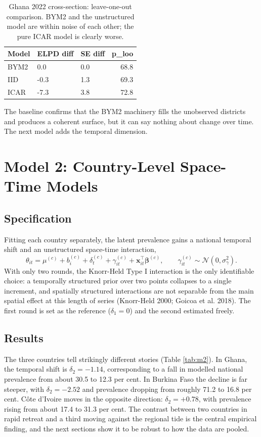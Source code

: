 \documentclass{article}
\begin{document}
\begin{longtable}[t]{lllr}
\caption{\label{tab:m1loo}\label{tab:m1loo}Ghana 2022 cross-section: leave-one-out comparison. BYM2 and the unstructured model are within noise of each other; the pure ICAR model is clearly worse.}\\
\toprule
Model & ELPD diff & SE diff & p\_loo\\
\midrule
BYM2 & 0.0 & 0.0 & 68.8\\
IID & -0.3 & 1.3 & 69.3\\
ICAR & -7.3 & 3.8 & 72.8\\
\bottomrule
\end{longtable}

The baseline confirms that the BYM2 machinery fills the unobserved
districts and produces a coherent surface, but it can say nothing about
change over time. The next model adds the temporal dimension.

\section{Model 2: Country-Level Space-Time Models}\label{sec:m2}

\subsection{Specification}\label{specification-1}

Fitting each country separately, the latent prevalence gains a national
temporal shift and an unstructured space-time interaction,
\begin{equation}
\theta_{it} = \mu^{(c)} + b_i^{(c)} + \delta_t^{(c)} + \gamma_{it}^{(c)}
              + \mathbf{x}_{it}^{\top}\bm{\beta}^{(c)},
\qquad
\gamma_{it}^{(c)} \sim \mathcal{N}(0, \sigma_\gamma^2).
\end{equation} With only two rounds, the Knorr-Held Type I interaction
is the only identifiable choice: a temporally structured prior over two
points collapses to a single increment, and spatially structured
interactions are not separable from the main spatial effect at this
length of series (Knorr-Held 2000; Goicoa et al. 2018). The first round
is set as the reference (\(\delta_1 = 0\)) and the second estimated
freely.

\subsection{Results}\label{results-1}

The three countries tell strikingly different stories (Table
\ref{tab:m2}). In Ghana, the temporal shift is \(\delta_2 = -1.14\),
corresponding to a fall in modelled national prevalence from about 30.5
to 12.3 per cent. In Burkina Faso the decline is far steeper, with
\(\delta_2 =
-2.52\) and prevalence dropping from roughly 71.2 to 16.8 per cent. Côte
d'Ivoire moves in the opposite direction: \(\delta_2 = +0.78\), with
prevalence rising from about 17.4 to 31.3 per cent. The contrast between
two countries in rapid retreat and a third moving against the regional
tide is the central empirical finding, and the next sections show it to
be robust to how the data are pooled.
\end{document}
